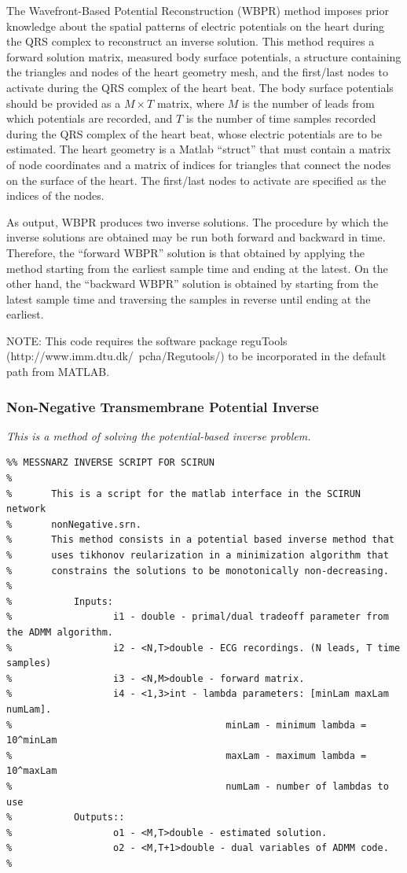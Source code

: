The Wavefront-Based Potential Reconstruction (WBPR) method imposes prior knowledge about the spatial patterns of electric potentials on the heart during the QRS complex to reconstruct an inverse solution. This method requires a forward solution matrix, measured body surface potentials, a structure containing the triangles and nodes of the heart geometry mesh, and the first/last nodes to activate during the QRS complex of the heart beat. The body surface potentials should be provided as a $M \times T$ matrix, where $M$ is the number of leads from which potentials are recorded, and $T$ is the number of time samples recorded during the QRS complex of the heart beat, whose electric potentials are to be estimated. The heart geometry is a Matlab ``struct'' that must contain a matrix of node coordinates and a matrix of indices for triangles that connect the nodes on the surface of the heart. The first/last nodes to activate are specified as the indices of the nodes.

As output, WBPR produces two inverse solutions. The procedure by which the inverse solutions are obtained may be run both forward and backward in time. Therefore, the ``forward WBPR'' solution is that obtained by applying the method starting from the earliest sample time and ending at the latest. On the other hand, the ``backward WBPR'' solution is obtained by starting from the latest sample time and traversing the samples in reverse until ending at the earliest.

NOTE: This code requires the software package reguTools (http://www.imm.dtu.dk/~pcha/Regutools/) to be incorporated in the default path from MATLAB.


\subsubsection{Non-Negative Transmembrane Potential Inverse}

\vspace{5pt}\textit{This is a method of solving the potential-based inverse problem.}\vspace{5pt}
\begin{verbatim}
%% MESSNARZ INVERSE SCRIPT FOR SCIRUN
%
%		This is a script for the matlab interface in the SCIRUN network
%		nonNegative.srn.
%		This method consists in a potential based inverse method that 
%		uses tikhonov reularization in a minimization algorithm that 
%		constrains the solutions to be monotonically non-decreasing.
%		
%			Inputs:
%				   i1 - double - primal/dual tradeoff parameter from the ADMM algorithm.
%				   i2 - <N,T>double - ECG recordings. (N leads, T time samples)
%				   i3 - <N,M>double - forward matrix.
%				   i4 - <1,3>int - lambda parameters: [minLam maxLam numLam].
%			                           minLam - minimum lambda = 10^minLam
%			                           maxLam - maximum lambda = 10^maxLam
%			                           numLam - number of lambdas to use 
%			Outputs::
%				   o1 - <M,T>double - estimated solution.
%				   o2 - <M,T+1>double - dual variables of ADMM code.
%
\end{verbatim}

